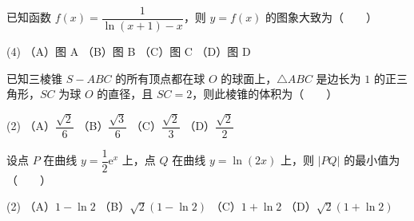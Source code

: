 \begin{question}
已知函数 $f(x)=\dfrac{1}{\ln(x+1)-x}$，则 $y=f(x)$ 的图象大致为\mbox{（　　）}
\nopagebreak[4]
\begin{center}\end{center}
\nopagebreak[4]
\begin{gkopts}(4)
\task （A）图 A
\task （B）图 B
\task （C）图 C
\task （D）图 D
\end{gkopts}

\end{question}
\begin{question}
已知三棱锥 $S-ABC$ 的所有顶点都在球 $O$ 的球面上，$\triangle ABC$ 是边长为 $1$ 的正三角形，$SC$ 为球 $O$ 的直径，且 $SC=2$，则此棱锥的体积为\mbox{（　　）}

\begin{gkopts}(2)
\task （A）$\dfrac{\sqrt2}{6}$
\task （B）$\dfrac{\sqrt3}{6}$
\task （C）$\dfrac{\sqrt2}{3}$
\task （D）$\dfrac{\sqrt2}{2}$
\end{gkopts}

\end{question}
\begin{question}
设点 $P$ 在曲线 $y=\dfrac12\mathrm e^x$ 上，点 $Q$ 在曲线 $y=\ln(2x)$ 上，则 $|PQ|$ 的最小值为\mbox{（　　）}

\begin{gkopts}(2)
\task （A）$1-\ln2$
\task （B）$\sqrt2(1-\ln2)$
\task （C）$1+\ln2$
\task （D）$\sqrt2(1+\ln2)$
\end{gkopts}

\end{question}

